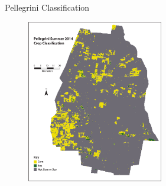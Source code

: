 \documentclass[  compress,xcolor={usenames,dvipsnames}]{beamer}
\begin{document}
\begin{frame}{Pellegrini Classification}
\begin{figure}
  \centering
  \includegraphics[width=0.53\textwidth]{Graphics/ARclassed.pdf}
\end{figure}
\end{frame}
\end{document}
